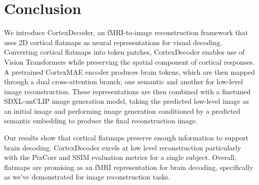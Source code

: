 \section{Conclusion}
\label{sec:conclusion}
We introduce CortexDecoder, an fMRI-to-image reconstruction framework that uses 2D cortical flatmaps as neural representations for visual decoding. Converting cortical flatmaps into token patches, CortexDecoder enables use of Vision Transformers while preserving the spatial component of cortical responses. A pretrained CortexMAE encoder produces brain tokens, which are then mapped through a dual cross-attention branch; one semantic and another for low-level image reconstruction. These representations are then combined with a finetuned SDXL-unCLIP image generation model, taking the predicted low-level image as an initial image and performing image generation conditioned by a predicted semantic embedding to produce the final reconstruction image.

Our results show that cortical flatmaps preserve enough information to support brain decoding. CortexDecoder excels at low level reconstruction particularly with the PixCorr and SSIM evaluation metrics for a single subject. Overall, flatmaps are promising as an fMRI representation for brain decoding, specifically as we’ve demonstrated for image reconstruction tasks.
